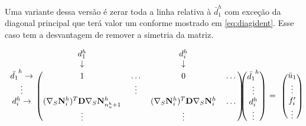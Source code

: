 Uma variante dessa versão é zerar toda a linha relativa à $\bar{d}^h_1$ com exceção da diagonal principal que terá valor um conforme mostrado em \eqref{eq:diagident}. Esse caso tem a desvantagem de remover a simetria da matriz.

\begin{equation} \label{eq:diagident}
\begin{blockarray}{ccccc}
& d_1^h &  & d_i ^h & & \\
& \downarrow &  & \downarrow & & \\
\begin{block}{c(cccc)}
\bar{d_1}^h \rightarrow & 1 & \hdots & 0 & \hdots \\
\vdots                  &   & \vdots &             \\
d_i^h       \rightarrow & \kij{i}{n_u^h + 1}   &      & \kij{i}{i}   & \hdots \\
& \vdots &      & \vdots   &  \\
\end{block}
\end{blockarray} \begin{blockarray}{c}
 \\
 \\
\begin{block}{(c)}
\bar{d_1}^h \\
\vdots\\
d_i^h \\
\vdots  \\
\end{block}
\end{blockarray} \begin{blockarray}{c}
 \\
 \\
 \\
= \\
 \\
\end{blockarray} \begin{blockarray}{c}
 \\
 \\
\begin{block}{(c)}
 \bar{u}_1 \\
\vdots\\
f^\prime_i \\
\vdots  \\
\end{block}
\end{blockarray}
\end{equation}


